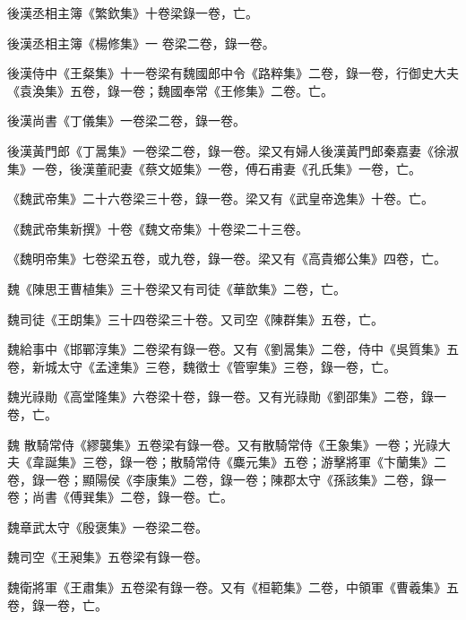 \begin{pinyinscope}
 後漢丞相主簿《繁欽集》十卷梁錄一卷，亡。



 後漢丞相主簿《楊修集》一
 卷梁二卷，錄一卷。



 後漢侍中《王粲集》十一卷梁有魏國郎中令《路粹集》二卷，錄一卷，行御史大夫《袁渙集》五卷，錄一卷；魏國奉常《王修集》二卷。亡。



 後漢尚書《丁儀集》一卷梁二卷，錄一卷。



 後漢黃門郎《丁暠集》一卷梁二卷，錄一卷。梁又有婦人後漢黃門郎秦嘉妻《徐淑集》一卷，後漢董祀妻《蔡文姬集》一卷，傅石甫妻《孔氏集》一卷，亡。



 《魏武帝集》二十六卷梁三十卷，錄一卷。梁又有《武皇帝逸集》十卷。亡。



 《魏武帝集新撰》十卷《魏文帝集》十卷梁二十三卷。



 《魏明帝集》七卷梁五卷，或九卷，錄一卷。梁又有《高貴鄉公集》四卷，亡。



 魏《陳思王曹植集》三十卷梁又有司徒《華歆集》二卷，亡。



 魏司徒《王朗集》三十四卷梁三十卷。又司空《陳群集》五卷，亡。



 魏給事中《邯鄲淳集》二卷梁有錄一卷。又有《劉暠集》二卷，侍中《吳質集》五卷，新城太守《孟達集》三卷，魏徵士《管寧集》三卷，錄一卷，亡。



 魏光祿勛《高堂隆集》六卷梁十卷，錄一卷。又有光祿勛《劉邵集》二卷，錄一卷，亡。



 魏
 散騎常侍《繆襲集》五卷梁有錄一卷。又有散騎常侍《王象集》一卷；光祿大夫《韋誕集》三卷，錄一卷；散騎常侍《麋元集》五卷；游擊將軍《卞蘭集》二卷，錄一卷；顯陽侯《李康集》二卷，錄一卷；陳郡太守《孫該集》二卷，錄一卷；尚書《傅巽集》二卷，錄一卷。亡。



 魏章武太守《殷褒集》一卷梁二卷。



 魏司空《王昶集》五卷梁有錄一卷。



 魏衛將軍《王肅集》五卷梁有錄一卷。又有《桓範集》二卷，中領軍《曹羲集》五卷，錄一卷，亡。




\end{pinyinscope}
